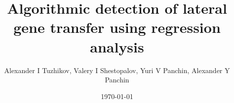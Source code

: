\title{Algorithmic detection of lateral gene transfer using regression
analysis}
\author{Alexander I Tuzhikov, Valery I Shestopalov,
Yuri V Panchin, Alexander Y Panchin}
\date{\today}
